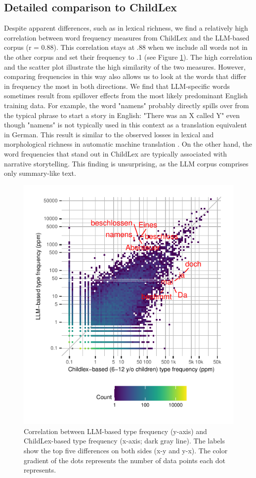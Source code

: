 \documentclass[jou, a4paper]{apa7}
\begin{document}
\subsection*{Detailed comparison to ChildLex}

Despite apparent differences, such as in lexical richness, we find a relatively high correlation between word frequency measures from ChildLex and the LLM-based corpus (r = 0.88). This correlation stays at .88 when we include all words not in the other corpus and set their frequency to .1 (see Figure \ref{fig:cor1}). The high correlation and the scatter plot illustrate the high similarity of the two measures. However, comparing frequencies in this way also allows us to look at the words that differ in frequency the most in both directions. We find that LLM-specific words sometimes result from spillover effects from the most likely predominant English training data. For example, the word "namens" probably directly spills over from the typical phrase to start a story in English: "There was an X called Y" even though "namens" is not typically used in this context as a translation equivalent in German. This result is similar to the observed losses in lexical and morphological richness in automatic machine translation \citep{vanmassenhove_machine_2021}. On the other hand, the word frequencies that stand out in ChildLex are typically associated with narrative storytelling. This finding is unsurprising, as the LLM corpus comprises only summary-like text.  

\begin{figure}[t]
  \centerline{
    \includegraphics[width=.55\textwidth]{figures/for 6-12ChildLexLLM-3.5-ch-test-3.pdf}}
    \caption{Correlation between LLM-based type frequency (y-axis) and ChildLex-based type frequency (x-axis; dark gray line). The labels show the top five differences on both sides (x-y and y-x). The color gradient of the dots represents the number of data points each dot represents.}
    \label{fig:cor1}
\end{figure}
\end{document}
